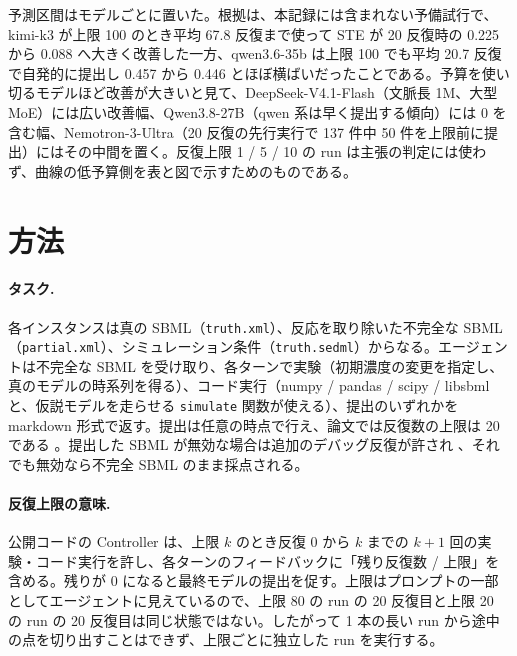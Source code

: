 \documentclass{article}
\begin{document}
予測区間はモデルごとに置いた。根拠は、本記録には含まれない予備試行で、kimi-k3 が上限 100 のとき平均 67.8 反復まで使って STE が 20 反復時の 0.225 から 0.088 へ大きく改善した一方、qwen3.6-35b は上限 100 でも平均 20.7 反復で自発的に提出し 0.457 から 0.446 とほぼ横ばいだったことである。予算を使い切るモデルほど改善が大きいと見て、DeepSeek-V4.1-Flash（文脈長 1M、大型 MoE）には広い改善幅、Qwen3.8-27B（qwen 系は早く提出する傾向）には 0 を含む幅、Nemotron-3-Ultra（20 反復の先行実行で 137 件中 50 件を上限前に提出）にはその中間を置く。反復上限 1 / 5 / 10 の run は主張の判定には使わず、曲線の低予算側を表と図で示すためのものである。

\section{方法}
\label{sec:method}
\paragraph{タスク.}
各インスタンスは真の SBML（\texttt{truth.xml}）、反応を取り除いた不完全な SBML（\texttt{partial.xml}）、シミュレーション条件（\texttt{truth.sedml}）からなる。エージェントは不完全な SBML を受け取り、各ターンで実験（初期濃度の変更を指定し、真のモデルの時系列を得る）、コード実行（numpy / pandas / scipy / libsbml と、仮説モデルを走らせる \texttt{simulate} 関数が使える）、提出のいずれかを markdown 形式で返す。提出は任意の時点で行え、論文では反復数の上限は 20 である \cite[s1.p3]{duan-2025-measuring}。提出した SBML が無効な場合は追加のデバッグ反復が許され \cite[s1.p4]{duan-2025-measuring}、それでも無効なら不完全 SBML のまま採点される。

\paragraph{反復上限の意味.}
公開コードの Controller は、上限 $k$ のとき反復 $0$ から $k$ までの $k+1$ 回の実験・コード実行を許し、各ターンのフィードバックに「残り反復数 / 上限」を含める。残りが 0 になると最終モデルの提出を促す。上限はプロンプトの一部としてエージェントに見えているので、上限 80 の run の 20 反復目と上限 20 の run の 20 反復目は同じ状態ではない。したがって 1 本の長い run から途中の点を切り出すことはできず、上限ごとに独立した run を実行する。
\end{document}

